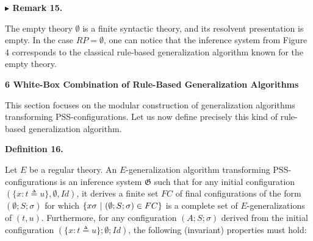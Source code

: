 \documentclass[10pt,a4paper]{amsart}
\begin{document}
 
 
\par\medskip\noindent\textbf{$\blacktriangleright$ Remark 15.}\par
 
 
The empty theory $\emptyset$ is a finite syntactic theory, and its resolvent presentation is empty. In the case $RP=\emptyset$, one can notice that the inference system from Figure 4 corresponds to the classical rule-based generalization algorithm known for the empty theory.\par
 
 
 
 


 
\par\medskip\noindent\textbf{6 White-Box Combination of Rule-Based Generalization Algorithms}\par
 
 
This section focuses on the modular construction of generalization algorithms transforming PSS-configurations. Let us now define precisely this kind of rule-based generalization algorithm.\par
 
 
 
\par\medskip\noindent\textbf{Definition 16.}\par
 
 
Let $E$ be a regular theory. An $E$-generalization algorithm transforming PSS-configurations is an inference system $\mathfrak{G}$ such that for any initial configuration $(\{x:t\triangleq u\},\emptyset,\mathit{Id})$, it derives a finite set $FC$ of final configurations of the form $(\emptyset;S;\sigma)$ for which $\{x\sigma\leavevmode\nobreak\ |\leavevmode\nobreak\ (\emptyset;S;\sigma)\in FC\}$ is a complete set of $E$-generalizations of $(t,u)$. Furthermore, for any configuration $(A;S;\sigma)$ derived from the initial configuration $(\{x:t\triangleq u\};\emptyset;\mathit{Id})$, the following (invariant) properties must hold:\par
  
\end{document}
